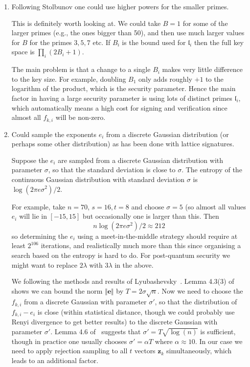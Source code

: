 \documentclass{llncs}
\renewcommand{\l}{\mathfrak{l}}
\newcommand{\e}{\mathbf{e}}
\newcommand{\z}{\mathbf{z}}
\begin{document}
\begin{enumerate}
\item Following Stolbunov one could use higher powers for the smaller primes.

This is definitely worth looking at. We could take $B=1$ for some of the larger primes (e.g., the ones bigger than 50), and then use much larger values for $B$ for the primes $3, 5, 7$ etc. If $B_i$ is the bound used for $\l_i$ then the full key space is $\prod_i (2B_i + 1)$.

The main problem is that a change to a single $B_i$ makes very little difference to the key size. For example, doubling $B_1$ only adds roughly $+1$ to the logarithm of the product, which is the security parameter.
Hence the main factor in having a large security parameter is using lots of distinct primes $\l_i$, which automatically means a high cost for signing and verification since almost all $f_{k,i}$ will be non-zero.



\item Could sample the exponents $e_i$ from a discrete Gaussian distribution (or perhaps some other distribution) as has been done with lattice signatures.

Suppose the $e_i$ are sampled from a discrete Gaussian distribution with parameter $\sigma$, so that the standard deviation is close to $\sigma$. The entropy of the continuous Gaussian distribution with standard deviation $\sigma$ is $\log( 2 \pi e \sigma^2 )/2$.

For example, take $n=70$, $s = 16, t = 8$ and choose $\sigma = 5$ (so almost all values $e_{i}$ will lie in $[-15,15]$ but occasionally one is larger than this. Then
\[
   n \log( 2 \pi e \sigma^2 )/2 \approx 212
\]
so determining the $e_i$ using a meet-in-the-middle strategy should require at least $2^{106}$ iterations, and realistically much more than this since organising a search based on the entropy is hard to do. For post-quantum security we might want to replace $2 \lambda$ with $3\lambda$ in the above.

We following the methods and results of Lyubashevsky~\cite{Lyu12}. Lemma 4.3(3) of~\cite{Lyu12} shows we can bound the norm $\Vert \e \Vert$ by $T = 2 \sigma \sqrt{n}$.
Now we need to choose the $f_{k,i}$ from a discrete Gaussian with parameter $\sigma'$, so that the distribution of $f_{k,i} - e_i$ is close (within statistical distance, though we could probably use Renyi divergence to get better results) to the discrete Gaussian with parameter $\sigma'$.
Lemma 4.6 of~\cite{Lyu12} suggests that $\sigma' = T \sqrt{\log(n)}$ is sufficient, though in practice one usually chooses $\sigma' = \alpha T $ where $\alpha \approx 10$.
In our case we need to apply rejection sampling to all $t$ vectors $\z_k$ simultaneously,
which leads to an additional factor.


\end{enumerate}
\end{document}

